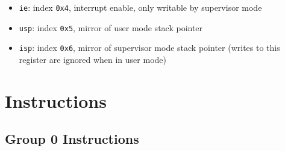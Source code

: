 \documentclass{article}
\begin{document}
\begin{itemize}
\begin{itemize}
		\item \texttt{ie}: index \texttt{0x4}, interrupt enable, only
			writable by supervisor mode
		\item \texttt{usp}: index \texttt{0x5}, mirror of user mode stack
			pointer
		\item \texttt{isp}: index \texttt{0x6}, mirror of supervisor mode
			stack pointer (writes to this register are ignored when in
			user mode)
		\end{itemize}
	\end{itemize}

\section{Instructions}
	\subsection{Group 0 Instructions}
\end{document}
